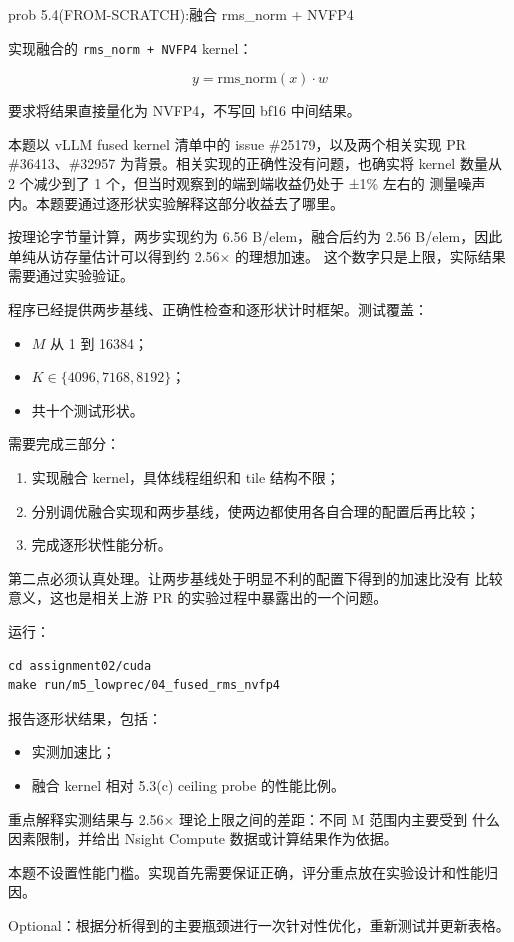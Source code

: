 \documentclass[11pt,a4paper,fontset=fandol]{ctexart}
\providecommand{\tightlist}{\setlength{\itemsep}{0pt}\setlength{\parskip}{0pt}}
\begin{document}
\begin{capstone}{prob 5.4(FROM-SCRATCH):融合 rms\_norm + NVFP4}

实现融合的 \texttt{rms\_\allowbreak{}norm\ +\ NVFP4} kernel：

\[
y = \mathrm{rms\_norm}(x)\cdot w
\]

要求将结果直接量化为 NVFP4，不写回 bf16 中间结果。

本题以 vLLM fused kernel 清单中的 issue \#25179，以及两个相关实现 PR
\#36413、\#32957 为背景。相关实现的正确性没有问题，也确实将 kernel
数量从 2 个减少到了 1 个，但当时观察到的端到端收益仍处于 ±1\% 左右的
测量噪声内。本题要通过逐形状实验解释这部分收益去了哪里。

按理论字节量计算，两步实现约为 6.56 B/elem，融合后约为 2.56
B/elem，因此单纯从访存量估计可以得到约 2.56× 的理想加速。
这个数字只是上限，实际结果需要通过实验验证。

程序已经提供两步基线、正确性检查和逐形状计时框架。测试覆盖：

\begin{itemize}
\tightlist
\item
  \(M\) 从 1 到 16384；
\item
  \(K \in \{4096, 7168, 8192\}\)；
\item
  共十个测试形状。
\end{itemize}

需要完成三部分：

\begin{enumerate}
\def\labelenumi{\arabic{enumi}.}
\tightlist
\item
  实现融合 kernel，具体线程组织和 tile 结构不限；
\item
  分别调优融合实现和两步基线，使两边都使用各自合理的配置后再比较；
\item
  完成逐形状性能分析。
\end{enumerate}

第二点必须认真处理。让两步基线处于明显不利的配置下得到的加速比没有
比较意义，这也是相关上游 PR 的实验过程中暴露出的一个问题。

运行：

\begin{verbatim}
cd assignment02/cuda
make run/m5_lowprec/04_fused_rms_nvfp4
\end{verbatim}

报告逐形状结果，包括：

\begin{itemize}
\tightlist
\item
  实测加速比；
\item
  融合 kernel 相对 5.3(c) ceiling probe 的性能比例。
\end{itemize}

重点解释实测结果与 2.56× 理论上限之间的差距：不同 M 范围内主要受到
什么因素限制，并给出 Nsight Compute 数据或计算结果作为依据。

本题不设置性能门槛。实现首先需要保证正确，评分重点放在实验设计和性能归因。

Optional：根据分析得到的主要瓶颈进行一次针对性优化，重新测试并更新表格。

\end{capstone}
\end{document}

